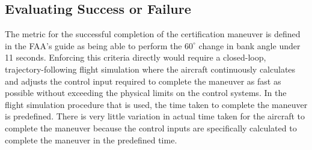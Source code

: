 

\subsection{Evaluating Success or Failure} \label{subsec:success_failure}

The metric for the successful completion of the certification maneuver is defined in the FAA's guide \cite{romanowski_flight_2018} as being able to perform the $60^\circ$ change in bank angle under 11 seconds. 
Enforcing this criteria directly would require a closed-loop, trajectory-following flight simulation where the aircraft continuously calculates and adjusts the control input required to complete the maneuver as fast as possible without exceeding the physical limits on the control systems. 
In the flight simulation procedure that is used, the time taken to complete the maneuver is predefined.
There is very little variation in actual time taken for the aircraft to complete the maneuver because the control inputs are specifically calculated to complete the maneuver in the predefined time.

